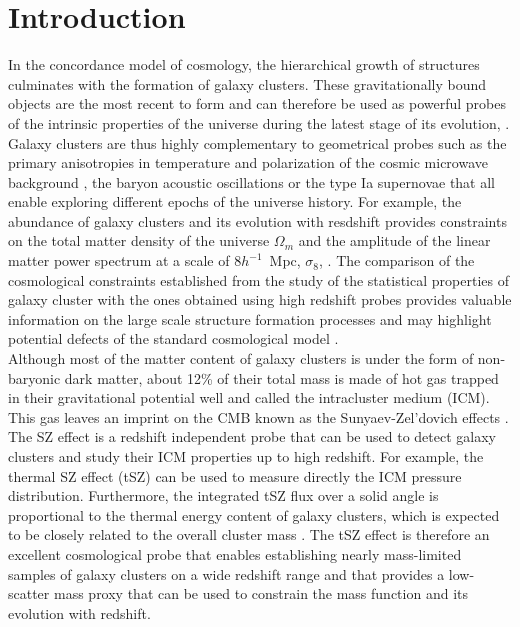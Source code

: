 \documentclass[twocolumn,traditabstract]{aa}
\begin{document}
\section{Introduction}\label{sec:Introduction}

In the concordance model of cosmology, the hierarchical growth of structures culminates with the formation of galaxy clusters. These gravitationally bound objects are the most recent to form and can therefore be used as powerful probes of the intrinsic properties of the universe during the latest stage of its evolution, \citep[ \emph{e.g.}][]{voi05}. Galaxy clusters are thus highly complementary to geometrical probes such as the primary anisotropies in temperature and polarization of the cosmic microwave background \citep[CMB;][]{pla18}, the baryon acoustic oscillations \citep{and14} or the type Ia supernovae \citep{per97} that all enable exploring different epochs of the universe history. For example, the abundance of galaxy clusters and its evolution with resdshift provides constraints on the total matter density of the universe $\Omega_m$ and the amplitude of the linear matter power spectrum at a scale of $8 h^{-1}$~Mpc, $\sigma_8$, \citep[\emph{e.g.}][]{pla16a}. The comparison of the cosmological constraints established from the study of the statistical properties of galaxy cluster with the ones obtained using high redshift probes provides valuable information on the large scale structure formation processes and may highlight potential defects of the standard cosmological model \citep[\emph{e.g.} ][]{boe16}.\\
\indent Although most of the matter content of galaxy clusters is under the form of non-baryonic dark matter, about 12\% of their total mass is made of hot gas trapped in their gravitational potential well and called the intracluster medium (ICM). This gas leaves an imprint on the CMB known as the Sunyaev-Zel'dovich effects \citep[SZ;][]{sun72}. The SZ effect is a redshift independent probe that can be used to detect galaxy clusters and study their ICM properties up to high redshift. For example, the thermal SZ effect (tSZ) can be used to measure directly the ICM pressure distribution. Furthermore, the integrated tSZ flux over a solid angle is proportional to the thermal energy content of galaxy clusters, which is expected to be closely related to the overall cluster mass \citep[see][]{arn10,pla14}. The tSZ effect is therefore an excellent cosmological probe that enables establishing nearly mass-limited samples of galaxy clusters on a wide redshift range \citep[e.g.][]{pla16b} and that provides a low-scatter mass proxy that can be used to constrain the mass function and its evolution with redshift.\\
\end{document}
